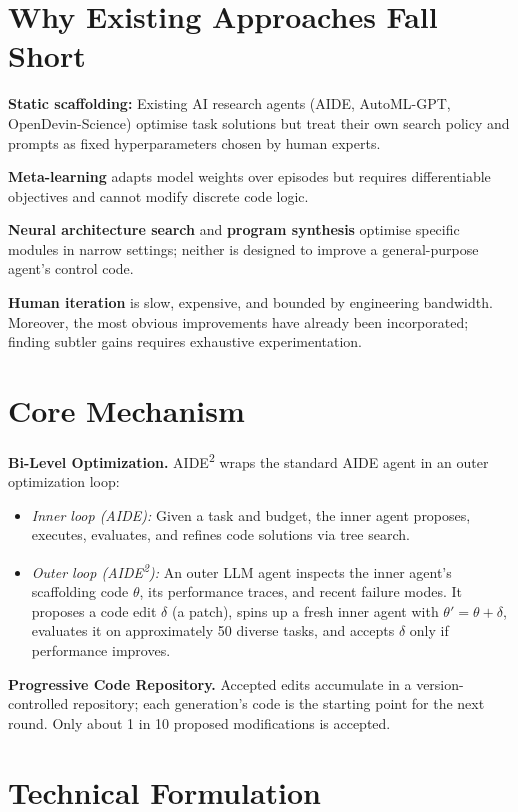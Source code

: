 \documentclass[10pt,twocolumn]{article}
\begin{document}
\section{Why Existing Approaches Fall Short}

\textbf{Static scaffolding:} Existing AI research agents (AIDE, AutoML-GPT,
OpenDevin-Science) optimise task solutions but treat their own search policy and
prompts as fixed hyperparameters chosen by human experts.

\textbf{Meta-learning} adapts model weights over episodes but requires
differentiable objectives and cannot modify discrete code logic.

\textbf{Neural architecture search} and \textbf{program synthesis} optimise
specific modules in narrow settings; neither is designed to improve a
general-purpose agent's control code.

\textbf{Human iteration} is slow, expensive, and bounded by engineering
bandwidth. Moreover, the most obvious improvements have already been
incorporated; finding subtler gains requires exhaustive experimentation.

\section{Core Mechanism}

\textbf{Bi-Level Optimization.} AIDE\textsuperscript{2} wraps the standard
AIDE agent in an outer optimization loop:
\begin{itemize}[itemsep=2pt,parsep=0pt]
  \item \emph{Inner loop (AIDE):} Given a task and budget, the inner agent
    proposes, executes, evaluates, and refines code solutions via tree search.
  \item \emph{Outer loop (AIDE\textsuperscript{2}):} An outer LLM agent
    inspects the inner agent's scaffolding code $\theta$, its performance traces,
    and recent failure modes. It proposes a code edit $\delta$ (a patch), spins
    up a fresh inner agent with $\theta' = \theta + \delta$, evaluates it on
    approximately 50 diverse tasks, and accepts $\delta$ only if performance
    improves.
\end{itemize}

\textbf{Progressive Code Repository.} Accepted edits accumulate in a
version-controlled repository; each generation's code is the starting point
for the next round. Only about 1 in 10 proposed modifications is accepted.

\section{Technical Formulation}
\end{document}
